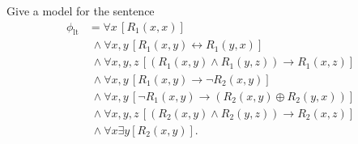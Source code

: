 \documentclass{homework}
\begin{document}
\begin{problem}
  Give a model for the sentence
  \begin{equation*}
    \begin{split}
      \phi_{\mathrm{lt}}
      & = \forall x\, [R_{1}(x, x)]\\
      & \; \land \forall x,y\, [R_{1}(x,y) \leftrightarrow R_{1}(y,x)]\\
      & \; \land \forall x,y,z\, [(R_{1}(x,y) \land R_{1}(y,z))
        \rightarrow R_{1}(x,z)]\\
      & \; \land \forall x,y\, [R_{1}(x,y) \rightarrow \neg R_{2}(x,y)]\\
      & \; \land \forall x,y\, [\neg R_{1}(x,y) \rightarrow (R_{2}(x,y)
        \oplus R_{2}(y,x))]\\
      & \; \land \forall x,y,z\, [(R_{2}(x,y) \land R_{2}(y,z))
        \rightarrow R_{2}(x,z)]\\
      & \; \land \forall x \exists y [ R_{2}(x,y) ].
    \end{split}
  \end{equation*}

\end{problem}
\end{document}
